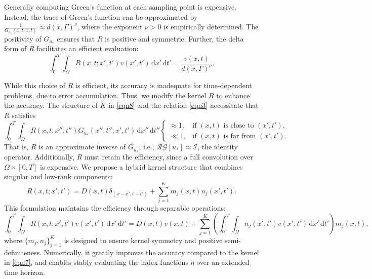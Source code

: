 \documentclass[onefignum,onetabnum]{siamart190516}
\numberwithin{equation}{section}
\begin{document}
Generally computing Green’s function at each sampling point is expensive.
Instead, the trace of Green’s function can be approximated by
$\frac{1}{G_{u_{*}}(x,t; x,t)} \approx d(x,\Gamma)^{\nu}$,
where the exponent $\nu>0$ is empirically determined.
The positivity of $G_{u_{*}}$ ensures that $R$ is positive and symmetric.
Further, the delta form of $R$ facilitates an efficient evaluation:
\begin{equation} \label{eqn7}
\int_{0}^{T} \int_{\Omega} R(x,t; x',t') v(x',t') \, \mathrm{d}x' \, \mathrm{d}t' = \frac{v(x,t)}{d(x,\Gamma)^{\nu}}.
\end{equation}

While this choice of $R$ is efficient, its accuracy is inadequate for time-dependent problems, due to error accumulation.
Thus, we modify the kernel $R$ to enhance the accuracy.
The structure of $K$ in \eqref{eqn8} and the relation \eqref{eqn3} necessitate that $R$ satisfies
\begin{equation} \label{eqn4}
\int_{0}^{T} \int_{\Omega} R(x,t; x'',t'') G_{u_{*}}(x'',t''; x',t') \, \mathrm{d}x'' \, \mathrm{d}t''
\begin{cases}
\approx 1, & \text{if } (x,t) \text{ is close to } (x',t'), \\
\ll 1, & \text{if } (x,t) \text{ is far from } (x',t').
\end{cases}
\end{equation}
That is, $R$ is an approximate inverse of $G_{u_{*}}$, i.e., $\mathcal{R}\mathcal{G}[u_{*}] \approx \mathcal{I}$, the identity operator.
Additionally, $R$ must retain the efficiency, since a full convolution over $\Omega \times [0,T]$ is expensive.
We propose a hybrid kernel structure that combines singular and low-rank components:
\begin{equation}\label{eqn:low-rank}
R(x,t;x',t') = D(x,t) \delta_{(x-x',t-t')} + \sum_{j=1}^{K} m_{j}(x,t) n_{j}(x',t').
\end{equation}
This formulation maintains the efficiency through separable operations:
\begin{equation*}
\int_{0}^{T}\!\!\! \int_{\Omega} R(x,t;x',t') v(x',t') \, \mathrm{d}x' \, \mathrm{d}t' = D(x,t) v(x,t) + \sum_{j=1}^{K} \left(\int_{0}^{T} \!\!\!\!\int_{\Omega} n_{j}(x',t') v(x',t') \, \mathrm{d}x' \, \mathrm{d}t' \right) m_{j}(x,t),
\end{equation*}
where $\{m_j, n_j\}_{j=1}^{K}$ is designed to ensure kernel symmetry and positive semi-definiteness.
Numerically, it greatly improves the accuracy compared to the kernel in \eqref{eqn7}, and enables stably evaluating the index functions $\eta$ over an extended time horizon.
\end{document}
